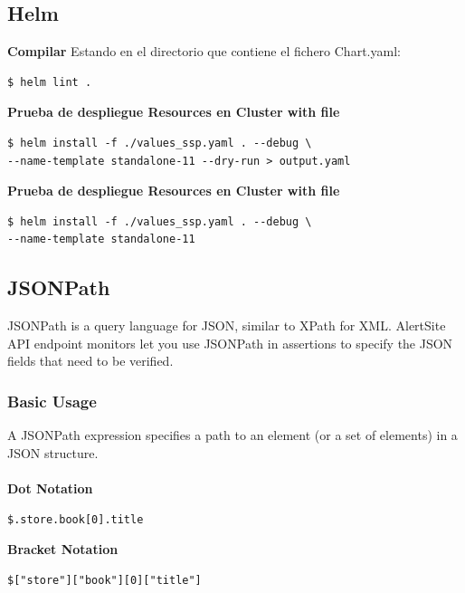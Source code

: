 \documentclass{article}
\newenvironment{codetemplate}[1][]{%
  \mybasecolorbox[#1]
  \itshape
}{%
  \endmybasecolorbox
}
\begin{document}
\subsection{Helm}
\textbf{Compilar}
\newline Estando en el directorio que contiene el fichero Chart.yaml:
\begin{codetemplate}{}
\begin{verbatim}
$ helm lint .
\end{verbatim}
\end{codetemplate}

\textbf{Prueba de despliegue Resources en Cluster with file}
\begin{codetemplate}{}
\begin{verbatim}
$ helm install -f ./values_ssp.yaml . --debug \
--name-template standalone-11 --dry-run > output.yaml
\end{verbatim}
\end{codetemplate}

\textbf{Prueba de despliegue Resources en Cluster with file}
\begin{codetemplate}{}
\begin{verbatim}
$ helm install -f ./values_ssp.yaml . --debug \
--name-template standalone-11
\end{verbatim}
\end{codetemplate}

\subsection{JSONPath}
JSONPath is a query language for JSON, similar to XPath for XML. AlertSite API endpoint monitors let you use JSONPath in assertions to specify the JSON fields that need to be verified.

\subsubsection{Basic Usage}
A JSONPath expression specifies a path to an element (or a set of elements) in a JSON structure. \\ \\
\textbf{Dot Notation}
\begin{codetemplate}{}
\begin{verbatim}
$.store.book[0].title
\end{verbatim}
\end{codetemplate}

\textbf{Bracket Notation}
\begin{codetemplate}{}
\begin{verbatim}
$["store"]["book"][0]["title"]
\end{verbatim}
\end{codetemplate}
\end{document}
